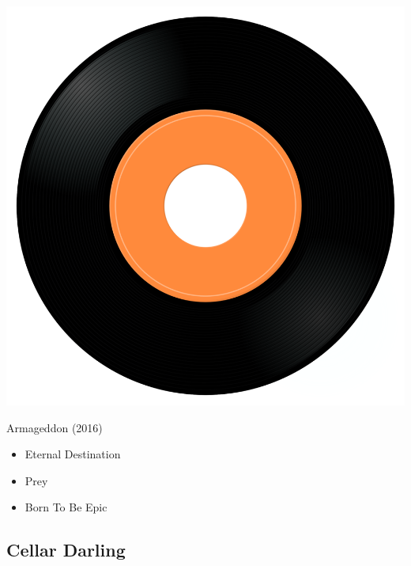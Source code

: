 \begin{minipage}[t]{0.25\textwidth}
\captionsetup{type=figure}
\includegraphics[width=\textwidth]{Images/cover.png}
\caption*{Armageddon (2016)}
\end{minipage}
\begin{minipage}[t]{0.25\textwidth}\vspace{0pt}
\begin{itemize}[nosep,leftmargin=1em,labelwidth=*,align=left]
	\setlength{\itemsep}{0pt}
	\item Eternal Destination
	\item Prey
	\item Born To Be Epic
\end{itemize}
\end{minipage}

\subsection{Cellar Darling}

